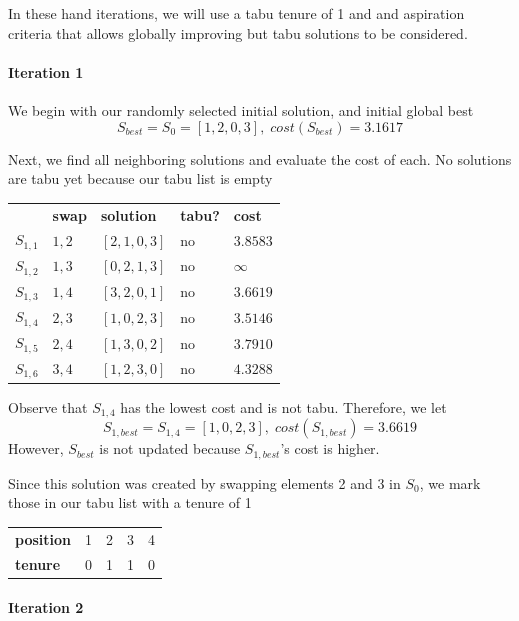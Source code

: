 \documentclass[a4paper]{article}
\newcommand{\subsubsubsection}[1]{\paragraph{#1} \mbox{}}
\begin{document}
In these hand iterations, we will use a tabu tenure of 1 and and aspiration criteria that allows globally improving but tabu solutions to be considered.

\subsubsubsection{Iteration 1}

We begin with our randomly selected initial solution, and initial global best
$$S_\textit{best} = S_0 = [ 1, 2, 0, 3 ], \; \textit{cost}(S_\textit{best}) = 3.1617$$

Next, we find all neighboring solutions and evaluate the cost of each. No solutions are tabu yet because our tabu list is empty
\begin{center}
\begin{tabular}{lllll}
& \textbf{swap}   & \textbf{solution}    & \textbf{tabu?} & \textbf{cost}  \\
$S_{1,1}$ & $1,2$ & $[2, 1, 0, 3]$ & no & $3.8583$ \\
$S_{1,2}$ & $1,3$ & $[0, 2, 1, 3]$ & no & $\infty$ \\
$S_{1,3}$ & $1,4$ & $[3, 2, 0, 1]$ & no & $3.6619$ \\
$S_{1,4}$ & $2,3$ & $[1, 0, 2, 3]$ & no & $3.5146$ \\
$S_{1,5}$ & $2,4$ & $[1, 3, 0, 2]$ & no & $3.7910$ \\
$S_{1,6}$ & $3,4$ & $[1, 2, 3, 0]$ & no & $4.3288$ \\
\end{tabular}
\end{center}
\vspace{1.5em}

Observe that $S_{1,4}$ has the lowest cost and is not tabu. Therefore, we let
$$S_{1, \textit{best}} = S_{1,4} = [1, 0, 2, 3], \; \textit{cost}(S_{1, \textit{best}}) = 3.6619$$
However, $S_\textit{best}$ is not updated because $S_{1, \textit{best}}$'s cost is higher.

Since this solution was created by swapping elements 2 and 3 in $S_0$, we mark those in our tabu list with a tenure of 1
\begin{center}
\begin{tabular}{lllll}
\textbf{position} & 1 & 2 & 3 & 4 \\
\textbf{tenure}   & 0 & 1 & 1 & 0
\end{tabular}
\end{center}
\vspace{1.5em}

\subsubsubsection{Iteration 2}
\end{document}
